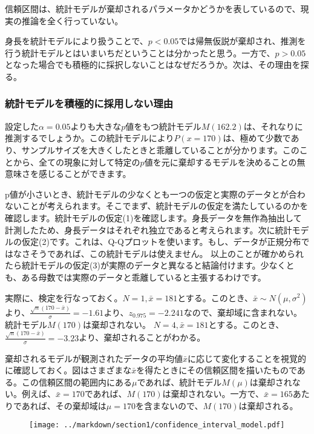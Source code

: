 \documentclass[a4paper,11pt,dvipdfmx]{jsarticle}
\begin{document}
信頼区間は、統計モデルが棄却されるパラメータかどうかを表しているので、現実の推論を全く行っていない。

身長を統計モデルにより扱うことで、$p<0.05$では帰無仮説が棄却され、推測を行う統計モデルとはいまいちだということは分かったと思う。一方で、$p>0.05$となった場合でも積極的に採択しないことはなぜだろうか。次は、その理由を探る。
\fi
\subsubsection{統計モデルを積極的に採用しない理由}
設定した$\alpha=0.05$よりも大きな$p$値をもつ統計モデル$M(162.2)$は、それなりに推測するでしょうか。この統計モデルにより$P(x=170)$は、極めて少数であり、サンプルサイズを大きくしたときと乖離していることが分かります。このことから、全ての現象に対して特定の$p$値を元に棄却するモデルを決めることの無意味さを感じることができます。

p値が小さいとき、統計モデルの少なくとも一つの仮定と実際のデータとが合わないことが考えられます。そこでまず、統計モデルの仮定を満たしているのかを確認します。統計モデルの仮定(1)を確認します。身長データを無作為抽出して計測したため、身長データはそれぞれ独立であると考えられます。次に統計モデルの仮定(2)です。これは、Q-Qプロットを使います。もし、データが正規分布ではなさそうであれば、この統計モデルは使えません。
以上のことが確かめられたら統計モデルの仮定(3)が実際のデータと異なると結論付けます。少なくとも、ある母数では実際のデータと乖離していると主張するわけです。



実際に、検定を行なっておく。$N=1,\bar{x}=181$とする。このとき、$\bar{x}\sim N(\mu,\sigma^2)$より、$\frac{\sqrt{n}(170-\bar{x})}{\sigma}=-1.61$より、$z_{0.975}=-2.241$なので、棄却域に含まれない。統計モデル$M(170)$は棄却されない。
$N=4,\bar{x}=181$とする。このとき、$\frac{\sqrt{n}(170-\bar{x})}{\sigma}=-3.23$より、棄却されることがわかる。

棄却されるモデルが観測されたデータの平均値$\bar{x}$に応じて変化することを視覚的に確認しておく。図はさまざまな$\bar{x}$を得たときにその信頼区間を描いたものである。この信頼区間の範囲内にある$\mu$であれば、統計モデル$M(\mu)$は棄却されない。例えば、$\bar{x}=170$であれば、$M(170)$は棄却されない。一方で、$\bar{x}=165$あたりであれば、その棄却域は$\mu=170$を含まないので、$M(170)$は棄却される。

\begin{figure}
\begin{center}
    \texttt{[image: ../markdown/section1/confidence\_interval\_model.pdf]}
  \end{center}
\end{figure}
\end{document}
